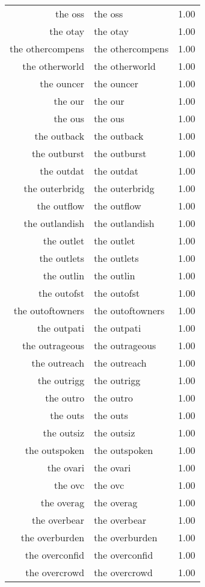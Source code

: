 \begin{table}[ht]
\begin{tabular}{rlr}
  the oss & the oss & 1.00 \\ 
  the otay & the otay & 1.00 \\ 
  the othercompens & the othercompens & 1.00 \\ 
  the otherworld & the otherworld & 1.00 \\ 
  the ouncer & the ouncer & 1.00 \\ 
  the our & the our & 1.00 \\ 
  the ous & the ous & 1.00 \\ 
  the outback & the outback & 1.00 \\ 
  the outburst & the outburst & 1.00 \\ 
  the outdat & the outdat & 1.00 \\ 
  the outerbridg & the outerbridg & 1.00 \\ 
  the outflow & the outflow & 1.00 \\ 
  the outlandish & the outlandish & 1.00 \\ 
  the outlet & the outlet & 1.00 \\ 
  the outlets & the outlets & 1.00 \\ 
  the outlin & the outlin & 1.00 \\ 
  the outofst & the outofst & 1.00 \\ 
  the outoftowners & the outoftowners & 1.00 \\ 
  the outpati & the outpati & 1.00 \\ 
  the outrageous & the outrageous & 1.00 \\ 
  the outreach & the outreach & 1.00 \\ 
  the outrigg & the outrigg & 1.00 \\ 
  the outro & the outro & 1.00 \\ 
  the outs & the outs & 1.00 \\ 
  the outsiz & the outsiz & 1.00 \\ 
  the outspoken & the outspoken & 1.00 \\ 
  the ovari & the ovari & 1.00 \\ 
  the ovc & the ovc & 1.00 \\ 
  the overag & the overag & 1.00 \\ 
  the overbear & the overbear & 1.00 \\ 
  the overburden & the overburden & 1.00 \\ 
  the overconfid & the overconfid & 1.00 \\ 
  the overcrowd & the overcrowd & 1.00 \\ 

\end{tabular}
\end{table}
